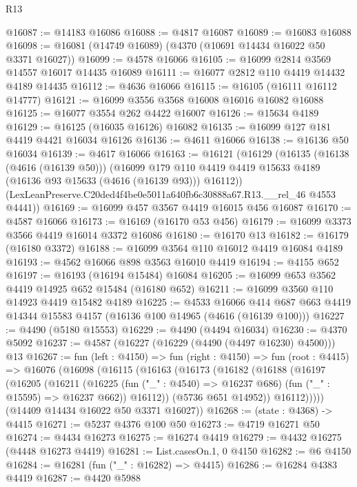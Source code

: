 \begin{lexlean}{R13}
\begin{coremodule}
@16087 := @14183 @16086
@16088 := @4817 @16087
@16089 := @16083 @16088
@16098 := @16081 (@14749 @16089) (@4370 (@10691 @14434 @16022 @50 @3371 @16027))
@16099 := @4578 @16066
@16105 := @16099 @2814 @3569 @14557 @16017 @14435 @16089
@16111 := @16077 @2812 @110 @4419 @14432 @4189 @14435
@16112 := @4636 @16066
@16115 := @16105 (@16111 @16112 @14777)
@16121 := @16099 @3556 @3568 @16008 @16016 @16082 @16088
@16125 := @16077 @3554 @262 @4422 @16007
@16126 := @15634 @4189
@16129 := @16125 (@16035 @16126) @16082
@16135 := @16099 @127 @181 @4419 @4421 @16034 @16126
@16136 := @4611 @16066
@16138 := @16136 @50 @16034
@16139 := @4617 @16066
@16163 := @16121
    (@16129
      (@16135
        (@16138 (@4616 (@16139 @50)))
        (@16099 @179 @110 @4419 @4419 @15633 @4189 (@16136 @93 @15633 (@4616 (@16139 @93))) @16112))
      (LexLeanPreserve.C20ded4f4be0e5011a640fb6c30888a67.R13.__rel_46 @4553 @4441))
@16169 := @16099 @457 @3567 @4419 @16015 @456 @16087
@16170 := @4587 @16066
@16173 := @16169 (@16170 @53 @456)
@16179 := @16099 @3373 @3566 @4419 @16014 @3372 @16086
@16180 := @16170 @13
@16182 := @16179 (@16180 @3372)
@16188 := @16099 @3564 @110 @16012 @4419 @16084 @4189
@16193 := @4562 @16066 @898 @3563 @16010 @4419
@16194 := @4155 @652
@16197 := @16193 (@16194 @15484) @16084
@16205 := @16099 @653 @3562 @4419 @14925 @652 @15484 (@16180 @652)
@16211 := @16099 @3560 @110 @14923 @4419 @15482 @4189
@16225 := @4533
    @16066
    @414
    @687
    @663
    @4419
    @14344
    @15583
    @4157
    (@16136 @100 @14965 (@4616 (@16139 @100)))
@16227 := @4490 (@5180 @15553)
@16229 := @4490 (@4494 @16034)
@16230 := @4370 @5092
@16237 := @4587 (@16227 (@16229 (@4490 (@4497 @16230) @4500))) @13
@16267 := fun (left : @4150) =>
  fun (right : @4150) =>
  fun (root : @4415) =>
  @16076
    (@16098
      (@16115
        (@16163
          (@16173
            (@16182
              (@16188
                (@16197
                  (@16205
                    (@16211
                      (@16225
                        (fun ("_" : @4540) => @16237 @686)
                        (fun ("_" : @15595) => @16237 @662))
                      @16112))
                  (@5736 @651 @14952))
                @16112)))))
      (@14409 @14434 @16022 @50 @3371 @16027))
@16268 := (state : @4368) -> @4415
@16271 := @5237 @4376 @100 @50
@16273 := @4719 @16271 @50
@16274 := @4434 @16273
@16275 := @16274 @4419
@16279 := @4432 @16275 (@4448 @16273 @4419)
@16281 := List.casesOn.{1, 0} @4150
@16282 := @6 @4150
@16284 := @16281 (fun ("_" : @16282) => @4415)
@16286 := @16284 @4383 @4419
@16287 := @4420 @5988

\end{coremodule}
\end{lexlean}

